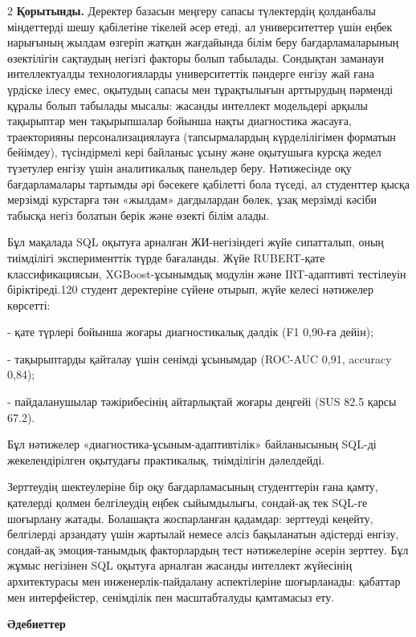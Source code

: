 \begin{multicols}{2}
{\bfseries Қорытынды.} Деректер базасын меңгеру сапасы түлектердің
қолданбалы міндеттерді шешу қабілетіне тікелей әсер етеді, ал
университеттер үшін еңбек нарығының жылдам өзгеріп жатқан жағдайында
білім беру бағдарламаларының өзектілігін сақтаудың негізгі факторы болып
табылады. Сондықтан заманауи интеллектуалды технологияларды
университеттік пәндерге енгізу жай ғана үрдіске ілесу емес, оқытудың
сапасы мен тұрақтылығын арттырудың пәрменді құралы болып табылады
мысалы: жасанды интеллект модельдері арқылы тақырыптар мен тақырыпшалар
бойынша нақты диагностика жасауға, траекторияны персонализациялауға
(тапсырмалардың күрделілігімен форматын бейімдеу), түсіндірмелі кері
байланыс ұсыну және оқытушыға курсқа жедел түзетулер енгізу үшін
аналитикалық панельдер беру. Нәтижесінде оқу бағдарламалары тартымды әрі
бәсекеге қабілетті бола түседі, ал студенттер қысқа мерзімді курстарға
тән «жылдам» дағдылардан бөлек, ұзақ мерзімді кәсіби табысқа негіз
болатын берік және өзекті білім алады.

Бұл мақалада SQL оқытуға арналған ЖИ-негізіндегі жүйе сипатталып, оның
тиімділігі эксперименттік түрде бағаланды. Жүйе RUBERT-қате
классификациясын, XGBoost-ұсынымдық модулін және IRT-адаптивті
тестілеуін біріктіреді.120 студент деректеріне сүйене отырып, жүйе
келесі нәтижелер көрсетті:

- қате түрлері бойынша жоғары диагностикалық дәлдік (F1 0,90-ға дейін);

- тақырыптарды қайталау үшін сенімді ұсынымдар (ROC-AUC 0,91, accuracy
0,84);

- пайдаланушылар тәжірибесінің айтарлықтай жоғары деңгейі (SUS 82.5
қарсы 67.2).

Бұл нәтижелер «диагностика-ұсыным-адаптивтілік» байланысының SQL-ді
жекелендірілген оқытудағы практикалық, тиімділігін дәлелдейді.

Зерттеудің шектеулеріне бір оқу бағдарламасының студенттерін ғана қамту,
қателерді қолмен белгілеудің еңбек сыйымдылығы, сондай-ақ тек SQL-ге
шоғырлану жатады. Болашақта жоспарланған қадамдар: зерттеуді кеңейту,
белгілерді арзандату үшін жартылай немесе әлсіз бақыланатын әдістерді
енгізу, сондай-ақ эмоция-танымдық факторлардың тест нәтижелеріне әсерін
зерттеу. Бұл жұмыс негізінен SQL оқытуға арналған жасанды интеллект
жүйесінің архитектурасы мен инженерлік-пайдалану аспектілеріне
шоғырланады: қабаттар мен интерфейстер, сенімділік пен масштабталуды
қамтамасыз ету.
\end{multicols}

\begin{center}
{\bfseries Әдебиеттер}
\end{center}

